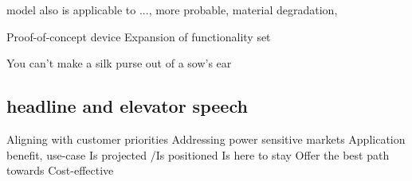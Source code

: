 model also is applicable to ..., more probable, material degradation, 

Proof-of-concept device
Expansion of functionality set 



You can't make a silk purse out of a sow's ear 

\subsection{headline and elevator speech}

Aligning with customer priorities
Addressing power sensitive markets
Application benefit, use-case
Is projected /Is positioned
Is here to stay
Offer the best path towards
Cost-effective 


















